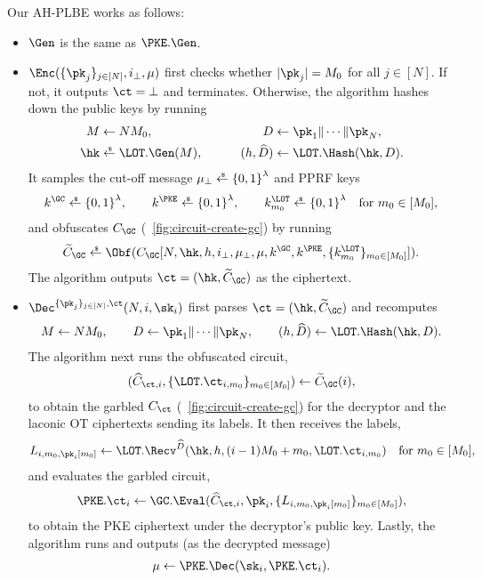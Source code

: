 \begin{construction}[AH-PLBE]\label{con:ahplbe}
Our AH-PLBE works as follows:
\begin{itemize}
\item $\Gen$ is the same as $\PKE.\Gen$.
\item $\Enc(\{\pk_j\}_{j\in[N]},i_\bot,\mu)$
first checks whether ${|\pk_j|=M_0}$ for all ${j\in[N]}$.
If not, it outputs ${\ct=\bot}$ and terminates.
Otherwise, the algorithm hashes down the public keys by running
\begin{align*}
M&\mathrlap{{}\gets NM_0,}
\hspace*{14em}
\mathllap{D}{}\gets\pk_1\concat\cdots\concat\pk_N,\\
\hk&\mathrlap{{}\draws\LOT.\Gen(M),}
\hspace*{14em}
\mathllap{(h,\widehat{D})}{}\gets\LOT.\Hash(\hk,D).
\end{align*}
It samples the cut-off message ${\mu_\bot\draws\bit^\lambda}$ and PPRF keys
\begin{align*}
k^\GC\draws\bit^\lambda,\qquad
k^\PKE\draws\bit^\lambda,\qquad
k^\LOT_{m_0}\draws\bit^\lambda\quad\textup{for }m_0\in[M_0],
\end{align*}
and obfuscates $C_\GC$ (\Figure~\ref{fig:circuit-create-gc}) by running
\begin{align*}
\widetilde{C}_\GC\draws\Obf(C_\GC[
N,\hk,h,i_\bot,\mu_\bot,\mu,
k^\GC,k^\PKE,\{k^\LOT_{m_0}\}_{m_0\in[M_0]}]).
\end{align*}
The algorithm outputs ${\ct=(\hk,\widetilde{C}_\GC)}$ as the ciphertext.
\item $\Dec^{\{\pk_j\}_{j\in[N]},\ct}(N,i,\sk_i)$
first parses ${\ct=(\hk,\widetilde{C}_\GC)}$ and recomputes
\begin{align*}
M\gets NM_0,\qquad
D\gets\pk_1\concat\cdots\concat\pk_N,\qquad
(h,\widehat{D})\gets\LOT.\Hash(\hk,D).
\end{align*}
The algorithm next runs the obfuscated circuit,
\begin{align*}
(\widehat{C}_{\ct,i},\{\LOT.\ct_{i,m_0}\}_{m_0\in[M_0]})
\gets\widetilde{C}_\GC(i),
\end{align*}
to obtain the garbled $C_\ct$ (\Figure~\ref{fig:circuit-create-gc}) for the decryptor and the laconic OT ciphertexts sending its labels.
It then receives the labels,
\begin{align*}
\WideNarrow{}{\hspace*{-1.5em}}
L_{i,m_0,\pk_i[m_0]}
\gets\LOT.\Recv^{\widehat{D}}(\hk,h,(i-1)M_0+m_0,\LOT.\ct_{i,m_0})
\WideNarrow{\quad\textup{for }}{\textup{ for }}
m_0\in[M_0],
\end{align*}
and evaluates the garbled circuit,
\begin{align*}
\PKE.\ct_i\gets\GC.\Eval(
\widehat{C}_{\ct,i},
\pk_i,
\{L_{i,m_0,\pk_i[m_0]}\}_{m_0\in[M_0]}
),
\end{align*}
to obtain the PKE ciphertext under the decryptor's public key.
Lastly, the algorithm runs and outputs (as the decrypted message)
\begin{align*}
\mu\gets\PKE.\Dec(\sk_i,\PKE.\ct_i).
\end{align*}
\end{itemize}
\end{construction}

